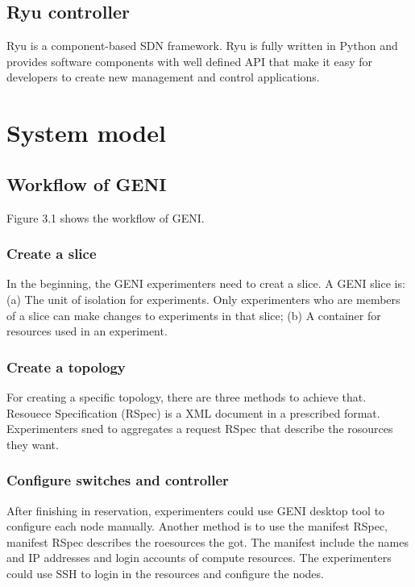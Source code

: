 \documentclass[a4paper,12pt]{report}
\begin{document}
\begin{CJK*}{UTF8}{bkai}
\begin{large}
     \section{Ryu controller}
     \qquad Ryu is a component-based SDN framework. Ryu is fully written in Python and provides software components with well defined API that make it easy for developers to create new management and control applications. 
     \chapter{System model}
     \section{Workflow of GENI}
     \qquad Figure 3.1 shows the workflow of GENI.
     \subsection{Create a slice}
     \qquad In the beginning, the GENI experimenters need to creat a slice. A GENI slice is: (a) The unit of isolation for experiments. Only experimenters who are members of a slice can make changes to experiments in that slice; (b) A container for resources used in an experiment.
     \subsection{Create a topology}
     \qquad For creating a specific topology, there are three methods to achieve that. Resouece Specification (RSpec) is a XML document in a prescribed format. Experimenters sned to  aggregates a request RSpec that describe the rosources they want.
     \subsection{Configure switches and controller}
     \qquad After finishing in reservation, experimenters could use GENI desktop tool to configure each node manually. Another method is to use the manifest RSpec, manifest RSpec describes the roesources the got. The manifest include the names and IP addresses and login accounts of compute resources. The experimenters could use SSH to login in the resources and configure the nodes.

\end{large}
\end{CJK*}
\end{document}
